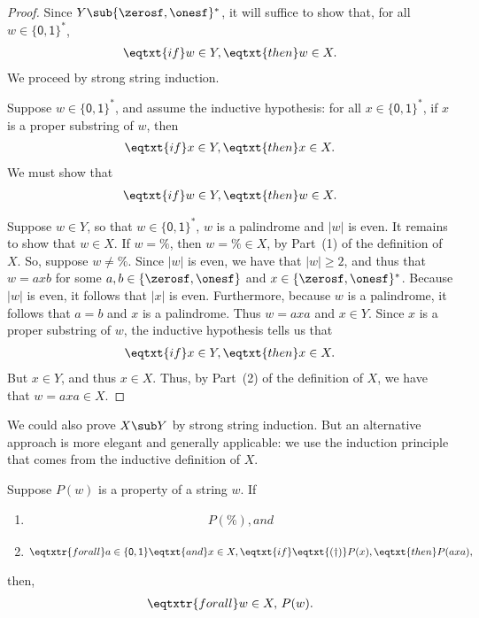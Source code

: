 \begin{proof}
Since $Y\sub\{\zerosf,\onesf\}^*$, it will suffice to show that,
for all $w\in\{\mathsf{0,1}\}^*$,
\begin{gather*}
\eqtxt{if}w\in Y, \eqtxt{then}w\in X.
\end{gather*}
We proceed by strong string induction.

Suppose $w\in\{\mathsf{0,1}\}^*$,
and assume the inductive hypothesis: for all $x\in\{\mathsf{0,1}\}^*$,
if $x$ is a proper substring of $w$, then
\begin{gather*}
\eqtxt{if}x\in Y, \eqtxt{then}x\in X .
\end{gather*}
We must show that
\begin{gather*}
\eqtxt{if}w\in Y, \eqtxt{then}w\in X .
\end{gather*}

Suppose $w\in Y$, so that $w\in\{\mathsf{0,1}\}^*$, $w$ is a
palindrome and $|w|$ is even.  It remains to show that $w\in X$.  If
$w=\%$, then $w=\%\in X$, by Part~(1) of the definition of $X$.  So,
suppose $w\neq\%$.  Since $|w|$ is even, we have that $|w|\geq 2$, and
thus that $w=axb$ for some $a,b\in\{\zerosf,\onesf\}$ and
$x\in\{\zerosf,\onesf\}^*$.  Because $|w|$ is even, it follows that
$|x|$ is even.  Furthermore, because $w$ is a palindrome, it follows
that $a=b$ and $x$ is a palindrome.  Thus $w=axa$ and $x\in Y$.  Since
$x$ is a proper substring of $w$, the inductive hypothesis tells us
that
\begin{gather*}
\eqtxt{if}x\in Y, \eqtxt{then}x\in X .
\end{gather*}
But $x\in Y$, and thus $x\in X$.  Thus, by Part~(2) of the definition
of $X$, we have that $w=axa\in X$.
\end{proof}

We could also prove $X\sub Y$ by strong string induction.
But an alternative approach is more elegant and generally applicable:
we use the induction principle that comes from the inductive definition
of $X$.

%
\begin{proposition}
Suppose $P(w)$ is a property of a string $w$.
If
\begin{enumerate}[\quad(1)]
\item\quad
\begin{gather*}
P(\%), and
\end{gather*}
\item\quad
\begin{gather*}
\eqtxtr{for all}a\in\{\mathsf{0,1}\}\eqtxt{and}x\in X,
\eqtxt{if}\eqtxt{\rm(\dag)} P(x),\eqtxt{then} P(axa) ,
\end{gather*}
\end{enumerate}
then,
\begin{gather*}
\eqtxtr{for all}w\in X,\,P(w) .
\end{gather*}
\end{proposition}

